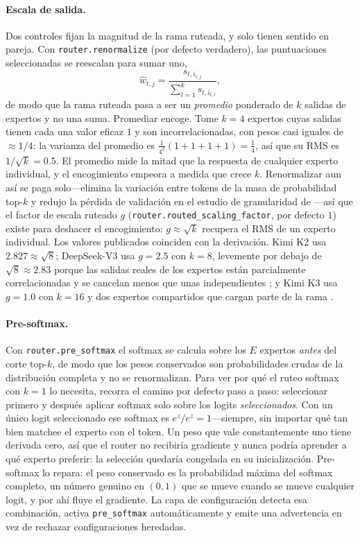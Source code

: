 \paragraph{Escala de salida.}
Dos controles fijan la magnitud de la rama ruteada, y solo tienen sentido en
pareja. Con \texttt{router.renormalize} (por defecto verdadero), las
puntuaciones seleccionadas se reescalan para sumar uno,
\begin{equation}
  \hat w_{t,j} = \frac{s_{t,i_{t,j}}}{\sum_{l=1}^{k} s_{t,i_{t,l}}},
\end{equation}
de modo que la rama ruteada pasa a ser un \emph{promedio} ponderado de $k$
salidas de expertos y no una suma. Promediar encoge. Tome $k = 4$ expertos
cuyas salidas tienen cada una valor eficaz $1$ y son incorrelacionadas, con
pesos casi iguales de $\approx 1/4$: la varianza del promedio es
$\tfrac{1}{4^2}(1+1+1+1) = \tfrac{1}{4}$, así que su RMS es
$1/\sqrt{k} = 0.5$. El promedio mide la mitad que la respuesta de cualquier
experto individual, y el encogimiento empeora a medida que crece $k$.
Renormalizar aun así se paga solo---elimina la variación entre tokens de la
masa de probabilidad top-$k$ y redujo la pérdida de validación en el estudio
de granularidad de \citet{krajewski2025scaling}---así que el factor de escala
ruteado $g$ (\texttt{router.routed\_scaling\_factor}, por defecto $1$) existe
para deshacer el encogimiento: $g \approx \sqrt{k}$ recupera el RMS de un
experto individual. Los valores publicados coinciden con la derivación. Kimi
K2 usa $2.827 \approx \sqrt{8}$; DeepSeek-V3 usa $g = 2.5$ con $k = 8$,
levemente por debajo de $\sqrt{8} \approx 2.83$ porque las salidas reales de
los expertos están parcialmente correlacionadas y se cancelan menos que unas
independientes \citep{deepseek2024v3}; y Kimi K3 usa $g = 1.0$ con $k = 16$ y
dos expertos compartidos que cargan parte de la rama \citep{kimiteam2026k3}.

\paragraph{Pre-softmax.}
Con \texttt{router.pre\_softmax} el softmax se calcula sobre los $E$ expertos
\emph{antes} del corte top-$k$, de modo que los pesos conservados son
probabilidades crudas de la distribución completa y no se renormalizan. Para
ver por qué el ruteo softmax con $k{=}1$ lo necesita, recorra el camino por
defecto paso a paso: seleccionar primero y después aplicar softmax solo sobre
los logits \emph{seleccionados}. Con un único logit seleccionado ese softmax
es $e^{z}/e^{z} = 1$---siempre, sin importar qué tan bien matchee el experto
con el token. Un peso que vale constantemente uno tiene derivada cero, así
que el router no recibiría gradiente y nunca podría aprender a qué experto
preferir: la selección quedaría congelada en su inicialización. Pre-softmax
lo repara: el peso conservado es la probabilidad máxima del softmax completo,
un número genuino en $(0,1)$ que se mueve cuando se mueve cualquier logit, y
por ahí fluye el gradiente. La capa de configuración detecta esa combinación,
activa \texttt{pre\_softmax} automáticamente y emite una advertencia en vez
de rechazar configuraciones heredadas.

